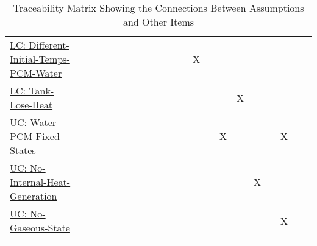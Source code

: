 \documentclass[12pt]{article}
\begin{document}
\begin{longtable}{l l l l l l l l l l l l l l l l l l l l l}
\\
\hyperref[likeChgDITPW]{LC: Different-Initial-Temps-PCM-Water} &  &  &  &  &  &  &  &  &  &  &  & X &  &  &  &  &  &  &  & 
\\
\hyperref[likeChgTLH]{LC: Tank-Lose-Heat} &  &  &  &  &  &  &  &  &  &  &  &  &  &  & X &  &  &  &  & 
\\
\hyperref[unlikeChgWPFS]{UC: Water-PCM-Fixed-States} &  &  &  &  &  &  &  &  &  &  &  &  &  & X &  &  &  & X &  & 
\\
\hyperref[unlikeChgNIHG]{UC: No-Internal-Heat-Generation} &  &  &  &  &  &  &  &  &  &  &  &  &  &  &  & X &  &  &  & 
\\
\hyperref[unlikeChgNGS]{UC: No-Gaseous-State} &  &  &  &  &  &  &  &  &  &  &  &  &  &  &  &  &  & X &  & 
\\
\bottomrule
\caption{Traceability Matrix Showing the Connections Between Assumptions and Other Items}
\label{Table:TraceMatAvsAll}
\end{longtable}
\end{document}
